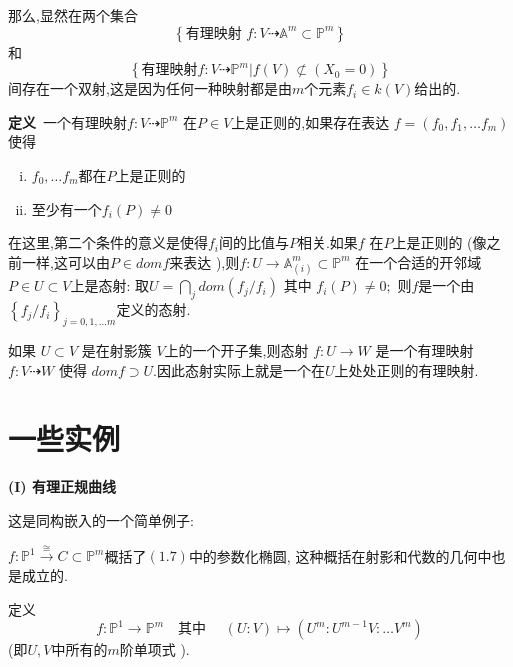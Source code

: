 \documentclass[UTF8]{book}
\begin{document}
		
		那么,显然在两个集合
		\begin{equation*}
		\left\{\text {有理映射 } f : V \dashrightarrow \mathbb{A} ^{ m } \subset \mathbb{P} ^{ m }\right\}
		\end{equation*}
		和
		\begin{equation*}
		\left\{\text {有理映射} f : V \dashrightarrow \mathbb{P} ^{ m } | f ( V ) \not\subset\left( X _{0}=0\right)\right\}
		\end{equation*}
		间存在一个双射,这是因为任何一种映射都是由$ m $个元素$f _{ i } \in k ( V )$给出的.
		
		
		\textbf{定义}\ 一个有理映射$f : V \dashrightarrow \mathbb{P} ^{ m }$ 在$P \in V$上是正则的,如果存在表达 $f =\left( f _{0}, f _{1}, \ldots f _{ m }\right)$使得
		\begin{enumerate}[(i)]
			\item $f _{0}, \dots f _{ m }$都在$ P $上是正则的
			\item 至少有一个$f_{i}(P) \neq 0$
		\end{enumerate}
	
		在这里,第二个条件的意义是使得$f_{i}$间的比值与$ P $相关.如果$f$ 在$P$上是正则的 (像之前一样,这可以由$P \in dom f$来表达 ),则$f : U \rightarrow \mathbb{A} ^{ m }_{(i)} \subset \mathbb{P} ^{ m }$ 在一个合适的开邻域
		$P \in U \subset V$上是态射: 取$U=\bigcap_{j} dom\left(f_{j} / f_{i}\right)$ 其中 $f_{i}(P) \neq 0 ;$ 则$f$是一个由$\left\{ f _{ j } / f _{ i }\right\}_{ j= 0,1, \ldots m }$定义的态射.
		
		
		如果 $U \subset V$ 是在射影簇 $V$上的一个开子集,则态射
		$f : U \rightarrow W$ 是一个有理映射 $f : V \dashrightarrow W$ 使得 $dom f \supset U$.因此态射实际上就是一个在$ U $上处处正则的有理映射.
		
	\section{一些实例}
		\textbf{(I) 有理正规曲线}
		
		
		 这是同构嵌入的一个简单例子:
		 
		 
		$f: \mathbb{P} ^{1} \stackrel{\cong}{\longrightarrow} C \subset \mathbb{P}^{m}$概括了$(1.7)$中的参数化椭圆, 这种概括在射影和代数的几何中也是成立的. 
	  
	  
	  	定义
		\begin{equation*}
		f : \mathbb{P} ^{1} \rightarrow \mathbb{P} ^{ m } \quad \text {其中 } \quad( U : V ) \mapsto\left( U ^{ m }: U ^{ m -1} V : \ldots V ^{ m }\right)
		\end{equation*}
		(即$U , V$中所有的$ m $阶单项式 ).
		
\end{document}
